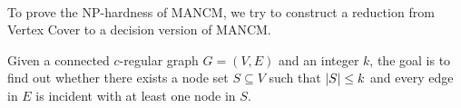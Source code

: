 \documentclass[sigconf]{acmart}
\begin{document}
\

To prove the NP-hardness of MANCM, we try to construct a reduction from Vertex Cover to a decision version of MANCM.

\begin{problem}
Given a connected \(c\)-regular graph \(G=(V,E)\) and an integer \(k\), the goal is to find out whether there exists a node set \(S\subseteq V\) such that \(\left|S \right|\le k\) and every edge in \(E\) is incident with at least one node in \(S\).
\end{problem}

\end{document}
